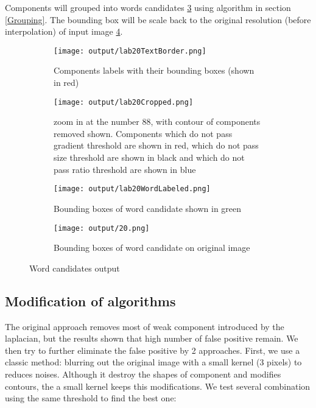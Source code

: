 Components will grouped into words candidates \ref{fig:BoundingBoxOfWordCandidateOnLabel} using algorithm in section \ref{Grouping}. The bounding box will be scale back to the original resolution (before interpolation) of input image \ref{fig:BoundingBoxOfWordCandidate}.


\begin{figure}

	\begin{subfigure}[t]{0.45\textwidth}
	\captionsetup{width=0.85\textwidth} 
		\texttt{[image: output/lab20TextBorder.png]}  \caption{Components labels with their bounding boxes (shown in red)}\label{fig:BoundingBoxOfCharacter} \end{subfigure}	
	\begin{subfigure}[t]{0.45\textwidth} 
	\captionsetup{width=0.80\textwidth} 
	\texttt{[image: output/lab20Cropped.png]}  
	\caption{zoom in at the number 88, with contour of components removed shown. Components which do not pass gradient threshold are shown in red, which do not pass size threshold are shown in black and which do not pass ratio threshold are shown in blue}\label{fig:labeling_contour} \end{subfigure}	
\centering	


	\begin{subfigure}[b]{0.45\textwidth}
	\captionsetup{width=0.85\textwidth} 
		\texttt{[image: output/lab20WordLabeled.png]}  \caption{Bounding boxes of word candidate shown in green}\label{fig:BoundingBoxOfWordCandidateOnLabel} \end{subfigure}
	\begin{subfigure}[b]{0.45\textwidth}
	\captionsetup{width=0.85\textwidth}
		\texttt{[image: output/20.png]}  \caption{Bounding boxes of word candidate on original image}\label{fig:BoundingBoxOfWordCandidate} \end{subfigure}			
\centering	
		
	\caption[Word candidates output] {Word candidates output}
	\label{fig:Wordcandidatesoutput}
\end{figure}
\subsection{Modification of algorithms}
The original approach removes most of weak component introduced by the laplacian, but the results shown that high number of false positive remain. We then try to further eliminate the false positive by 2 approaches. First, we use a classic method: blurring out the original image with a small kernel (3 pixels) to reduces noises. Although it destroy the shapes of component and modifies contours, the a small kernel keeps this modifications. We test several combination using the same threshold to find the best one:

